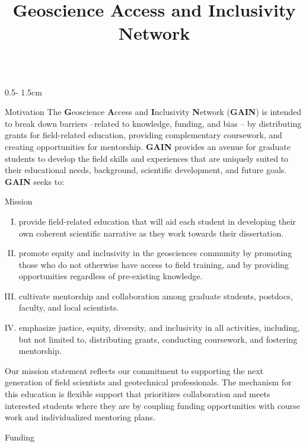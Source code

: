 \documentclass{uwposter}
\title{Geoscience Access and Inclusivity Network}
\begin{document}
\begin{frame}
\begin{columns}[onlytextwidth]


\begin{column}{0.5\textwidth - 1.5cm}
    \begin{block}{Motivation}
       The \textbf{\alert{G}}eoscience \textbf{\alert{A}}ccess and \textbf{\alert{I}}nclusivity \textbf{\alert{N}}etwork (\textbf{\alert{GAIN}}) is intended to break down barriers –related to knowledge, funding, and bias – by distributing grants for field-related education, providing complementary coursework, and creating opportunities for mentorship.
   	\textbf{\alert{GAIN}} provides an avenue for graduate students to develop the field skills and experiences that are uniquely suited to their educational needs, background, scientific development, and future goals.
	 \textbf{\alert{GAIN}} seeks to:
    \end{block}

    \begin{block}{Mission}
         \begin{enumerate}[I.]
         \item
    	provide field-related education that will aid each student in developing their own coherent scientific narrative as they work towards their dissertation.
    	\item
	promote equity and inclusivity in the geosciences community by promoting those who do not otherwise have access to field training, and by providing opportunities regardless of pre-existing knowledge.
    	\item
	cultivate mentorship and collaboration among graduate students, postdocs, faculty, and local scientists.
    	\item
	emphasize justice, equity, diversity, and inclusivity in all activities, including, but not limited to, distributing grants, conducting coursework, and fostering mentorship.
	\end{enumerate}
	Our mission statement reflects our commitment to supporting the next generation of field scientists and geotechnical professionals.
        The mechanism for this education is flexible support that prioritizes collaboration and meets interested students where they are by coupling funding opportunities with course work and individualized mentoring plans.

    \end{block}

    \begin{block}{Funding}
               

\end{block}
\end{column}
\end{columns}
\end{frame}
\end{document}
